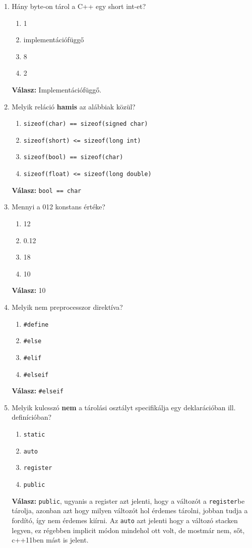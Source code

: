 \documentclass[a4paper,11.5pt,table]{article}
\begin{document}
	\begin{enumerate}[1.)]
		\item  Hány byte-on tárol a C++ egy short int-et?
		\begin{enumerate}
			\item 1
			\item implementációfüggő
			\item 8
			\item 2
		\end{enumerate}
		\textbf{Válasz:} Implementációfüggő.
		\item Melyik reláció \textbf{hamis} az alábbiak közül?
		\begin{enumerate}
			\item \texttt{sizeof(char) == sizeof(signed char)}
			\item \texttt{sizeof(short) <= sizeof(long int)}
			\item \texttt{sizeof(bool) == sizeof(char)}
			\item \texttt{sizeof(float) <= sizeof(long double)}
		\end{enumerate}
		\textbf{Válasz:} \texttt{bool == char}
		\item Mennyi a 012 konstans értéke?
		\begin{enumerate}
			\item 12
			\item 0.12
			\item 18
			\item 10
		\end{enumerate}
		\textbf{Válasz:} 10
		\item Melyik nem preprocesszor direktíva?
		\begin{enumerate}
			\item \texttt{\#define}
			\item \texttt{\#else}
			\item \texttt{\#elif}
			\item \texttt{\#elseif}
		\end{enumerate}
		\textbf{Válasz:} \texttt{\#elseif}
		\item Melyik kulcsszó \textbf{nem} a tárolási osztályt specifikálja egy deklarációban ill.
		definícióban?
		\begin{enumerate}
			\item \texttt{static}
			\item \texttt{auto}
			\item \texttt{register}
			\item \texttt{public}
		\end{enumerate}
		\textbf{Válasz:} \texttt{public}, ugyanis a register azt jelenti, hogy a változót a \texttt{register}be tárolja, azonban azt hogy milyen változót hol érdemes tárolni, jobban tudja a fordító, így nem érdemes kiírni. Az \texttt{auto} azt jelenti hogy a változó stacken legyen, ez régebben implicit módon mindehol ott volt, de mostmár nem, sőt, c++11ben mást is jelent.
		

\end{enumerate}
\end{document}
